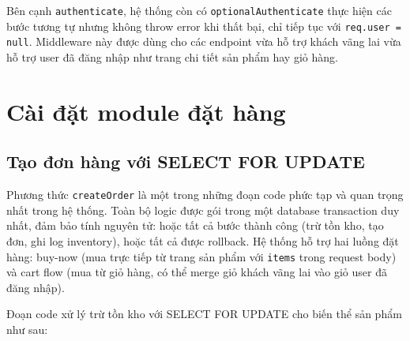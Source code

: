 Bên cạnh \texttt{authenticate}, hệ thống còn có \texttt{optionalAuthenticate} thực hiện các bước tương tự nhưng không throw error khi thất bại, chỉ tiếp tục với \texttt{req.user = null}. Middleware này được dùng cho các endpoint vừa hỗ trợ khách vãng lai vừa hỗ trợ user đã đăng nhập như trang chi tiết sản phẩm hay giỏ hàng.

\section{Cài đặt module đặt hàng}

\subsection{Tạo đơn hàng với SELECT FOR UPDATE}

Phương thức \texttt{createOrder} là một trong những đoạn code phức tạp và quan trọng nhất trong hệ thống. Toàn bộ logic được gói trong một database transaction duy nhất, đảm bảo tính nguyên tử: hoặc tất cả bước thành công (trừ tồn kho, tạo đơn, ghi log inventory), hoặc tất cả được rollback. Hệ thống hỗ trợ hai luồng đặt hàng: buy-now (mua trực tiếp từ trang sản phẩm với \texttt{items} trong request body) và cart flow (mua từ giỏ hàng, có thể merge giỏ khách vãng lai vào giỏ user đã đăng nhập).

Đoạn code xử lý trừ tồn kho với SELECT FOR UPDATE cho biến thể sản phẩm như sau:

